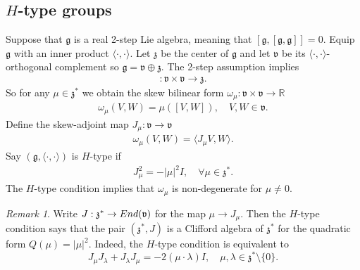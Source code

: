 \documentclass[11pt]{amsart}
\theoremstyle{plain}
\theoremstyle{definition}
\theoremstyle{remark}
\newtheorem{remark}[theorem]{Remark}
\numberwithin{equation}{section}
\def\fz{\mathfrak{z}}
\def\fg{\mathfrak{g}}
\def\fv{\mathfrak{v}}
\def\mz{\setminus\{0\}}
\numberwithin{equation}{section}
\begin{document}
\subsection{$H$-type groups}\label{H-type}
Suppose that $\fg$ is a real 2-step Lie algebra, meaning that $[\fg, [\fg, \fg]]=0$. Equip $\fg$ with an inner product $\langle\cdot,\cdot \rangle$. Let $\fz$ be the center of $\fg$ and let $\fv$ be its  $\langle\cdot, \cdot\rangle$-orthogonal complement so $\fg=\fv\oplus\fz$.  The 2-step assumption  implies 
\begin{align*}
	[\cdot, \cdot]: \fv\times\fv\to \fz.
\end{align*}
So for any $\mu\in \mathfrak{z}^*$  we obtain the skew bilinear form $\omega_\mu: \mathfrak{v}\times\mathfrak{v}\to \mathbb{R}$ 
\begin{align*}
	\omega_\mu(V, W)=\mu\left([V, W]\right), \quad V, W\in \mathfrak{v}.
\end{align*}
Define the skew-adjoint map $J_\mu:\mathfrak{v}\to\mathfrak{v}$
\begin{align*}
	\omega_\mu(V, W)=\langle J_\mu V, W\rangle.
\end{align*}
Say $(\mathfrak{g}, \langle\cdot, \cdot\rangle)$ is $H$-type if
\begin{align*}
	J^2_\mu=-|\mu|^2I, \quad \forall \mu\in \mathfrak{z}^*.
\end{align*}
The $H$-type condition implies that $\omega_\mu$ is non-degenerate for $\mu\neq 0$. 

\begin{remark}
	Write $J: \fz^*\to {\rm End}(\fv)$ for the map $\mu\to J_\mu$. Then the $H$-type condition says that the pair $(\fz^*, J)$ is a Clifford algebra of $\fz^*$ for the quadratic form $Q(\mu)=|\mu|^2$. Indeed, the $H$-type condition is equivalent to 
    \begin{equation}\label{e:htypePolar}
        J_\mu J_\lambda+J_\lambda J_\mu=-2(\mu \cdot \lambda) I, \quad \mu, \lambda\in \fz^*\mz.
    \end{equation}
\end{remark}
\end{document}
